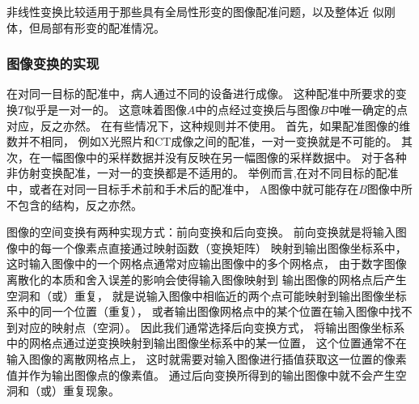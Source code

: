 非线性变换比较适用于那些具有全局性形变的图像配准问题，以及整体近
似刚体，但局部有形变的配准情况。

\subsubsection{图像变换的实现}
在对同一目标的配准中，病人通过不同的设备进行成像。
这种配准中所要求的变换$T$似乎是一对一的。
这意味着图像$A$中的点经过变换后与图像$B$中唯一确定的点对应，反之亦然。
在有些情况下，这种规则并不使用。
首先，如果配准图像的维数并不相同，
例如X光照片和CT成像之间的配准，一对一变换就是不可能的。
其次，在一幅图像中的采样数据并没有反映在另一幅图像的采样数据中。
对于各种非仿射变换配准，一对一的变换都是不适用的。
举例而言,在对不同目标的配准中，或者在对同一目标手术前和手术后的配准中，
A图像中就可能存在$B$图像中所不包含的结构，反之亦然。

图像的空间变换有两种实现方式：前向变换和后向变换。
前向变换就是将输入图像中的每一个像素点直接通过映射函数（变换矩阵）
映射到输出图像坐标系中，
这时输入图像中的一个网格点通常对应输出图像中的多个网格点，
由于数字图像离散化的本质和舍入误差的影响会使得输入图像映射到
输出图像的网格点后产生空洞和（或）重复，
就是说输入图像中相临近的两个点可能映射到输出图像坐标系中的同一个位置（重复），
或者输出图像网格点中的某个位置在输入图像中找不到对应的映射点（空洞）。
因此我们通常选择后向变换方式，
将输出图像坐标系中的网格点通过逆变换映射到输出图像坐标系中的某一位置，
这个位置通常不在输入图像的离散网格点上，
这时就需要对输入图像进行插值获取这一位置的像素值并作为输出图像点的像素值。
通过后向变换所得到的输出图像中就不会产生空洞和（或）重复现象。

